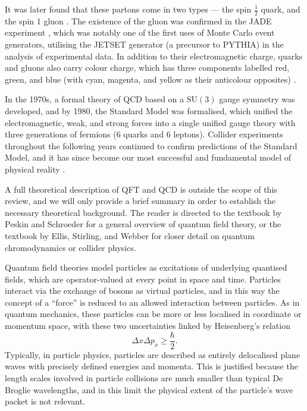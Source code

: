 \documentclass[12pt,a4paper]{report}
\begin{document}
It was later found that these partons come in two types --- the spin $\frac{1}{2}$ quark, and the spin 1 gluon \cite{ParticleDataGroup:2024cfk}. The existence of the gluon was confirmed in the JADE experiment \cite{JADE:1979rke}, which was notably one of the first uses of Monte Carlo event generators, utilising the JETSET generator (a precursor to PYTHIA) in the analysis of experimental data. In addition to their electromagnetic charge, quarks and gluons also carry colour charge, which has three components labelled red, green, and blue (with cyan, magenta, and yellow as their anticolour opposites) \cite{Thomson:2013zua,ParticleDataGroup:2024cfk}.

In the 1970s, a formal theory of QCD based on a $\text{SU}(3)$ gauge symmetry was developed, and by 1980, the Standard Model was formalised, which unified the electromagnetic, weak, and strong forces into a single unified gauge theory with three generations of fermions (6 quarks and 6 leptons). Collider experiments throughout the following years continued to confirm predictions of the Standard Model, and it has since become our most successful and fundamental model of physical reality \cite{Thomson:2013zua, Schwartz:2014sze}.

A full theoretical description of QFT and QCD is outside the scope of this review, and we will only provide a brief summary in order to establish the necessary theoretical background. The reader is directed to the textbook by Peskin and Schroeder \cite{Peskin:1995ev} for a general overview of quantum field theory, or the textbook by Ellis, Stirling, and Webber \cite{Ellis:1996mzs} for closer detail on quantum chromodynamics or collider physics.

Quantum field theories model particles as excitations of underlying quantised fields, which are operator-valued at every point in space and time. Particles interact via the exchange of bosons as virtual particles, and in this way the concept of a ``force'' is reduced to an allowed interaction between particles. As in quantum mechanics, these particles can be more or less localised in coordinate or momentum space, with these two uncertainties linked by Heisenberg's relation
\begin{equation}
  \Delta x \Delta p_x \geq \frac{\hbar}{2}.
\end{equation}
Typically, in particle physics, particles are described as entirely delocalised plane waves with precisely defined energies and momenta. This is justified because the length scales involved in particle collisions are much smaller than typical De Broglie wavelengths, and in this limit the physical extent of the particle's wave packet is not relevant.
\end{document}
